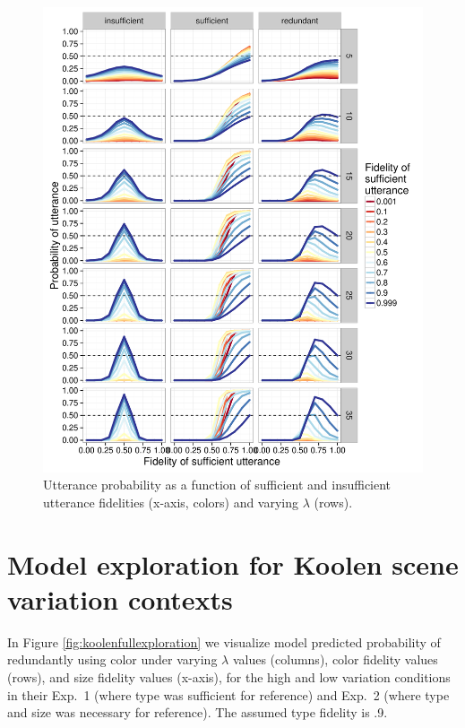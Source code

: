 \documentclass[11pt]{article}
\newcommand{\figref}[1]{Figure \ref{#1}}
\begin{document}
\begin{figure}
\includegraphics[width=\textwidth]{pics/modelexploration-fullfidelityeffect-unlogged-wide}
\caption{Utterance probability as a function of sufficient and insufficient utterance fidelities (x-axis, colors) and varying $\lambda$ (rows).}
\label{fig:fullexploration}
\end{figure}

\section{Model exploration for Koolen scene variation contexts}
\label{app:koolenexploration}

In \figref{fig:koolenfullexploration} we visualize model predicted probability of redundantly using color under varying $\lambda$ values (columns), color fidelity values (rows), and size fidelity values (x-axis), for the high and low variation conditions in their Exp.~1 (where type was sufficient for reference) and Exp.~2 (where type and size was necessary for reference). The assumed type fidelity is .9.
\end{document}
